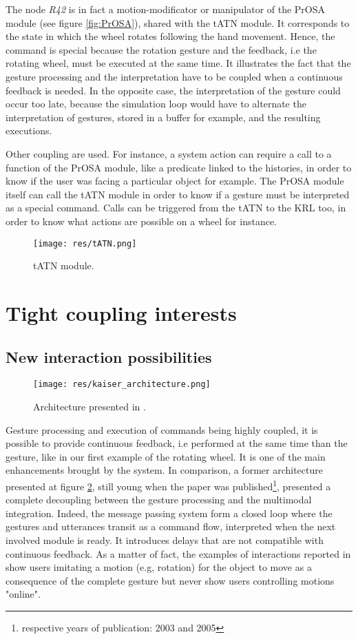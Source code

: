 \documentclass[a4paper]{article}
\begin{document}
The node \textit{R42} is in fact a motion-modificator or manipulator of the PrOSA module (see figure \ref{fig:PrOSA}), shared with the tATN module. It corresponds to the state in which the wheel rotates following the hand movement. Hence, the command is special because the rotation gesture and the feedback, i.e the rotating wheel, must be executed at the same time. It illustrates the fact that the gesture processing and the interpretation have to be coupled when a continuous feedback is needed. In the opposite case, the interpretation of the gesture could occur too late, because the simulation loop would have to alternate the interpretation of gestures, stored in a buffer for example, and the resulting executions.

Other coupling are used. For instance, a system action can require a call to a function of the PrOSA module, like a predicate linked to the histories, in order to know if the user was facing a particular object for example. The PrOSA module itself can call the tATN module in order to know if a gesture must be interpreted as a special command. Calls can be triggered from the tATN to the KRL too, in order to know what actions are possible on a wheel for instance.

\begin{figure}
\centering
\texttt{[image: res/tATN.png]}
\caption{\label{fig:tATN}tATN module.}
\end{figure}

\section{Tight coupling interests}

\subsection{New interaction possibilities}
\label{subsec:possibilities}

\begin{figure}
\centering
\texttt{[image: res/kaiser\_architecture.png]}
\caption{\label{fig:kaiser}Architecture presented in \cite{kaiser}.}
\end{figure}

Gesture processing and execution of commands being highly coupled, it is possible to provide continuous feedback, i.e performed at the same time than the gesture, like in our first example of the rotating wheel. It is one of the main enhancements brought by the system. In comparison, a former architecture presented at figure \ref{fig:kaiser}, still young when the paper was published\footnote{respective years of publication: 2003 and 2005}, presented a complete decoupling between the gesture processing and the multimodal integration. Indeed, the message passing system form a closed loop where the gestures and utterances transit as a command flow, interpreted when the next involved module is ready. It introduces delays that are not compatible with continuous feedback. As a matter of fact, the examples of interactions reported in \cite{kaiser} show users imitating a motion (e.g, rotation) for the object to move as a consequence of the complete gesture but never show users controlling motions "online".
\end{document}
